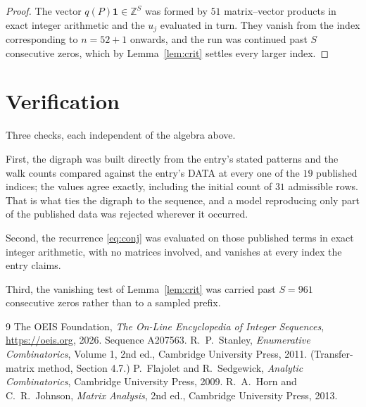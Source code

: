 \documentclass[11pt,a4paper]{article}
\theoremstyle{plain}
\theoremstyle{definition}
\begin{document}
\begin{proof}
The vector $q(P)\mathbf{1}\in\mathbb{Z}^{S}$ was formed by $51$ matrix--vector
products in exact integer arithmetic and the $u_j$ evaluated in turn. They vanish from the
index corresponding to $n=52+1$ onwards, and the run was continued past $S$ consecutive
zeros, which by Lemma~\ref{lem:crit} settles every larger index.
\end{proof}

\section{Verification}

Three checks, each independent of the algebra above.

First, the digraph was built directly from the entry's stated patterns and the walk counts
compared against the entry's DATA at every one of the $19$ published indices; the
values agree exactly, including the initial count of $31$ admissible rows. That is
what ties the digraph to the sequence, and a model reproducing only part of the published
data was rejected wherever it occurred.

Second, the recurrence \eqref{eq:conj} was evaluated on those published terms in exact
integer arithmetic, with no matrices involved, and vanishes at every index the entry claims.

Third, the vanishing test of Lemma~\ref{lem:crit} was carried past $S=961$ consecutive
zeros rather than to a sampled prefix.

\begin{thebibliography}{9}
 The OEIS Foundation, \emph{The On-Line Encyclopedia of Integer
Sequences}, \url{https://oeis.org}, 2026. Sequence A207563.
 R.~P.~Stanley, \emph{Enumerative Combinatorics}, Volume 1, 2nd ed.,
Cambridge University Press, 2011. (Transfer-matrix method, Section 4.7.)
 P.~Flajolet and R.~Sedgewick, \emph{Analytic Combinatorics}, Cambridge
University Press, 2009.
 R.~A.~Horn and C.~R.~Johnson, \emph{Matrix Analysis}, 2nd ed., Cambridge
University Press, 2013.
\end{thebibliography}
\end{document}
